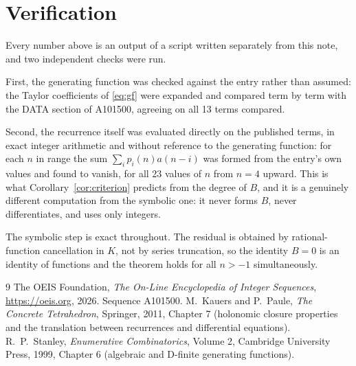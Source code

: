 \documentclass[11pt,a4paper]{article}
\theoremstyle{plain}
\theoremstyle{definition}
\begin{document}
\section{Verification}

Every number above is an output of a script written separately from this note, and two
independent checks were run.

First, the generating function was checked against the entry rather than assumed: the
Taylor coefficients of \eqref{eq:gf} were expanded and compared term by term with the DATA
section of A101500, agreeing on all 13 terms compared.

Second, the recurrence itself was evaluated directly on the published terms, in exact
integer arithmetic and without reference to the generating function: for each $n$ in range
the sum $\sum_{i}p_{i}(n)a(n-i)$ was formed from the entry's own values and found to
vanish, for all 23 values of $n$ from $n=4$ upward. This is what
Corollary~\ref{cor:criterion} predicts from the degree of $B$, and it is a genuinely
different computation from the symbolic one: it never forms $B$, never differentiates, and
uses only integers.

The symbolic step is exact throughout. The residual is obtained by rational-function
cancellation in $K$, not by series truncation, so the identity $B=0$ is an
identity of functions and the theorem holds for all $n>-1$ simultaneously.

\begin{thebibliography}{9}
 The OEIS Foundation, \emph{The On-Line Encyclopedia of Integer Sequences},
\url{https://oeis.org}, 2026. Sequence A101500.
 M.~Kauers and P.~Paule, \emph{The Concrete Tetrahedron}, Springer, 2011,
Chapter 7 (holonomic closure properties and the translation between recurrences and
differential equations).
 R.~P.~Stanley, \emph{Enumerative Combinatorics}, Volume 2, Cambridge
University Press, 1999, Chapter 6 (algebraic and D-finite generating functions).
\end{thebibliography}
\end{document}

